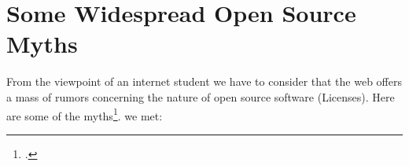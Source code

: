 %
%
%
%

%




\section{Some Widespread Open Source Myths}

From the viewpoint of an internet student we have to consider that the web
offers a mass of rumors concerning the nature of open source software
(Licenses). Here are some of the myths\footcite[At least one time even a
scientific legally discussing book is talking about the \enquote{myth around open
source licenses} - although only as part of  the title: cf][1ff,
especially 209ff]{GuiOvd2006a}.
we met:
 

